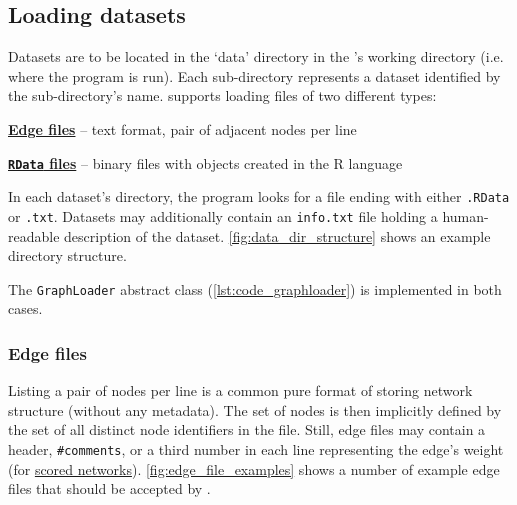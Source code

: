 \subsection{Loading datasets}



Datasets are to be located in the `data' directory in the \graffs's working directory (i.e. where the program is run).
Each sub-directory represents a dataset identified by the sub-directory's name.
\graffs supports loading files of two different types:
\begin{description}[itemsep=\zerospace]
    \item \hyperref[sec:edge_files]{\textbf{Edge files}} -- text format, pair of adjacent nodes per line
    \item \hyperref[sec:rdata_files]{\textbf{\texttt{RData} files}} -- binary files with objects created in the R language~\cite{RCoreTeamLanguageEnvironmentStatistical2009}
\end{description}

In each dataset's directory, the program looks for a file ending with either \texttt{.RData} or \texttt{.txt}.
Datasets may additionally contain an \texttt{info.txt} file holding a human-readable description of the dataset.
\autoref{fig:data_dir_structure} shows an example directory structure.

The \texttt{GraphLoader} abstract class (\autoref{lst:code_graphloader}) is implemented in both cases.


\vspace*{-0.5mm}
\subsubsection*{Edge files}\label{sec:edge_files}

Listing a pair of nodes per line is a common pure format of storing network structure (without any metadata).
The set of nodes is then implicitly defined by the set of all distinct node identifiers in the file.
Still, edge files may contain a header, \texttt{\#comments}, or a third number in each line representing the edge's weight (for \hyperref[sec:scored_networks]{scored networks}).
\autoref{fig:edge_file_examples} shows a number of example edge files that should be accepted by \graffs.

